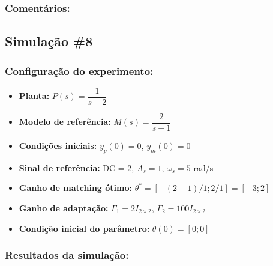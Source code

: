 \documentclass[10pt]{article}
\begin{document}
\subsubsection{Comentários:}

\newpage

\subsection{Simulação \#8}
\subsubsection{Configuração do experimento:}
\begin{itemize}
\item \textbf{Planta:} $P(s) = \dfrac{1}{s - 2}$
\item \textbf{Modelo de referência:} $M(s) = \dfrac{2}{s + 1}$
\item \textbf{Condições iniciais:} $y_p(0)=0$, $y_m(0)=0$
\item \textbf{Sinal de referência:} DC = 2, $A_s=1$, $\omega_s=5$ rad/s
\item \textbf{Ganho de matching ótimo:} $\theta^* = [-(2+1)/1;2/1] = [-3;2]$
\item \textbf{Ganho de adaptação:} $\Gamma_1 = 2I_{2\times2}$, $\Gamma_2 = 100I_{2\times2}$
\item \textbf{Condição inicial do parâmetro:} $\theta(0) = [0;0]$
\end{itemize}

\subsubsection{Resultados da simulação:}
\end{document}
